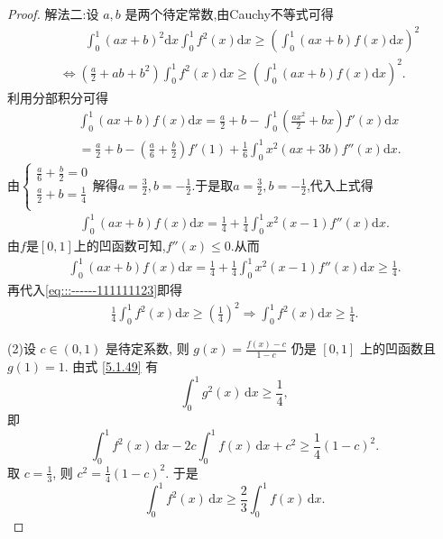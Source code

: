 \documentclass[../../main.tex]{subfiles}%
\begin{document}
\begin{proof}
{\color{blue}解法二:}设 \( a,b \) 是两个待定常数,由Cauchy不等式可得
\begin{align}
&\quad \quad \int_0^1{\left( ax+b \right) ^2\mathrm{d}x}\int_0^1{f^2\left( x \right) \mathrm{d}x}\geqslant \left( \int_0^1{\left( ax+b \right) f\left( x \right) \mathrm{d}x} \right) ^2\nonumber
\\
&\Longleftrightarrow \left( \frac{a}{2}+ab+b^2 \right) \int_0^1{f^2\left( x \right) \mathrm{d}x}\geqslant \left( \int_0^1{\left( ax+b \right) f\left( x \right) \mathrm{d}x} \right) ^2.\label{eq:::------111111123}
\end{align}
利用分部积分可得
\begin{align*}
&\int_0^1{\left( ax+b \right) f\left( x \right) \mathrm{d}x}=\frac{a}{2}+b-\int_0^1{\left( \frac{ax^2}{2}+bx \right) f' \left( x \right) \mathrm{d}x}
\\
&=\frac{a}{2}+b-\left( \frac{a}{6}+\frac{b}{2} \right) f'\left( 1 \right) +\frac{1}{6}\int_0^1{x^2\left( ax+3b \right) f'' \left( x \right) \mathrm{d}x}.
\end{align*}
由$\begin{cases}
\frac{a}{6}+\frac{b}{2}=0\\
\frac{a}{2}+b=\frac{1}{4}\\
\end{cases}$解得$a=\frac{3}{2},b=-\frac{1}{2}$.于是取$a=\frac{3}{2},b=-\frac{1}{2}$,代入上式得
\begin{align*}
\int_0^1{\left( ax+b \right) f\left( x \right) \mathrm{d}x}=\frac{1}{4}+\frac{1}{4}\int_0^1{x^2\left( x-1 \right) f'' \left( x \right) \mathrm{d}x}.
\end{align*}
由$f$是$[0,1]$上的凹函数可知,$f''(x)\leqslant 0.$从而
\begin{align*}
\int_0^1{\left( ax+b \right) f\left( x \right) \mathrm{d}x}=\frac{1}{4}+\frac{1}{4}\int_0^1{x^2\left( x-1 \right) f'' \left( x \right) \mathrm{d}x}\geqslant \frac{1}{4}.
\end{align*}
再代入\eqref{eq:::------111111123}即得
\begin{align*}
\frac{1}{4}\int_0^1{f^2\left( x \right) \mathrm{d}x}\geqslant \left( \frac{1}{4} \right) ^2\Longrightarrow \int_0^1{f^2\left( x \right) \mathrm{d}x}\geqslant \frac{1}{4}.
\end{align*}

(2)设 \( c \in (0,1) \) 是待定系数, 则 \( g(x) = \frac{f(x) - c}{1 - c} \) 仍是 \([0,1]\) 上的凹函数且 \( g(1) = 1 \). 由式 \eqref{5.1.49} 有
\[
\int_{0}^{1} g^2(x) \, \mathrm{d}x \geqslant \frac{1}{4},
\]
即
\[
\int_{0}^{1} f^2(x) \, \mathrm{d}x - 2c \int_{0}^{1} f(x) \, \mathrm{d}x + c^2 \geqslant \frac{1}{4}(1 - c)^2.
\]
取 \( c = \frac{1}{3} \), 则 \( c^2 = \frac{1}{4}(1 - c)^2 \). 于是
\[
\int_{0}^{1} f^2(x) \, \mathrm{d}x \geqslant \frac{2}{3} \int_{0}^{1} f(x) \, \mathrm{d}x.
\]
\end{proof}
\end{document}
